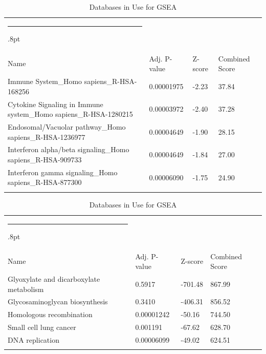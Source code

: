 \documentclass[3p,authoryear,preprint,12pt]{elsarticle}
\makeatletter
\def\hlinewd#1{%
  \noalign{\ifnum0=`}\fi\hrule \@height #1%
  \futurelet\reserved@a\@xhline}
\def\tbltoprule{\hlinewd{.8pt}\\[-12pt]}
\def\tblbottomrule{\noalign{\vspace*{6pt}}\hline\noalign{\vspace*{2pt}}}
\def\tblmidrule{\noalign{\vspace*{6pt}}\hline\noalign{\vspace*{2pt}}}
\makeatother
\begin{document}
\begin{table}[!htbp]
	\caption{{Databases in Use for GSEA} }
	\label{tw-de478ae31cc6}
	\def\arraystretch{1}
	\ignorespaces 
	\centering 
	\begin{tabulary}{\linewidth}{p{\dimexpr.65\tabcolsep}p{\dimexpr.15\tabcolsep}p{\dimexpr.1\tabcolsep}p{\dimexpr.1\tabcolsep}}
		\tbltoprule Name & Adj. P-value & Z-score & Combined Score\\
		\tblmidrule
Immune System\_Homo sapiens\_R-HSA-168256 & 0.00001975 & -2.23 & 37.84 \\
Cytokine Signaling in Immune system\_Homo sapiens\_R-HSA-1280215 & 0.00003972 & -2.40 & 37.28 \\
Endosomal/Vacuolar pathway\_Homo sapiens\_R-HSA-1236977 & 0.00004649 & -1.90 & 28.15 \\
Interferon alpha/beta signaling\_Homo sapiens\_R-HSA-909733 & 0.00004649 & -1.84 & 27.00 \\
Interferon gamma signaling\_Homo sapiens\_R-HSA-877300 & 0.00006090 & -1.75 & 24.90 \\
		\tblbottomrule
	\end{tabulary}\par 
\end{table}
\begin{table}[!htbp]
	\caption{{Databases in Use for GSEA} }
	\label{tw-de478ae31cc6}
	\def\arraystretch{1}
	\ignorespaces 
	\centering 
	\begin{tabulary}{\linewidth}{p{\dimexpr.65\tabcolsep}p{\dimexpr.15\tabcolsep}p{\dimexpr.1\tabcolsep}p{\dimexpr.1\tabcolsep}}
		\tbltoprule Name & Adj. P-value & Z-score & Combined Score\\
		\tblmidrule
Glyoxylate and dicarboxylate metabolism & 0.5917 & -701.48 & 867.99 \\
Glycosaminoglycan biosynthesis & 0.3410 & -406.31 & 856.52 \\
Homologous recombination & 0.00001242 & -50.16 & 744.50 \\
Small cell lung cancer & 0.001191 & -67.62 & 628.70 \\
DNA replication & 0.00006099 & -49.02 & 624.51 \\
		\tblbottomrule
	\end{tabulary}\par 
\end{table}
\end{document}
